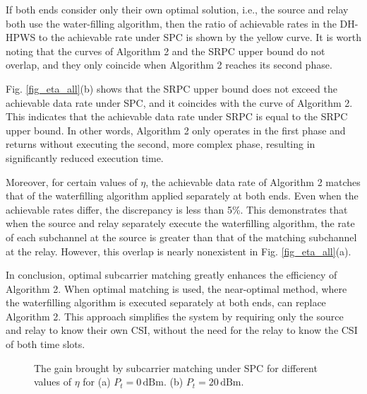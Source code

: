 \documentclass[lettersize,journal]{IEEEtran}
\begin{document}
	If both ends consider only their own optimal solution, i.e., the source and relay both use the water-filling algorithm, then the ratio of achievable rates in the DH-HPWS to the achievable rate under SPC is shown by the yellow curve. It is worth noting that the curves of Algorithm 2 and the SRPC upper bound do not overlap, and they only coincide when Algorithm 2 reaches its second phase.
	
	Fig.  \ref{fig_eta_all}(b) shows that the SRPC upper bound does not exceed the achievable data rate under SPC, and it coincides with the curve of Algorithm 2. This indicates that the achievable data rate under SRPC is equal to the SRPC upper bound. In other words, Algorithm 2 only operates in the first phase and returns without executing the second, more complex phase, resulting in significantly reduced execution time.
	
	Moreover, for certain values of \( \eta \), the achievable data rate of Algorithm 2 matches that of the waterfilling algorithm applied separately at both ends. Even when the achievable rates differ, the discrepancy is less than 5\%. This demonstrates that when the source and relay separately execute the waterfilling algorithm, the rate of each subchannel at the source is greater than that of the matching subchannel at the relay. However, this overlap is nearly nonexistent in Fig. \ref{fig_eta_all}(a).
	
	In conclusion, optimal subcarrier matching greatly enhances the efficiency of Algorithm 2. When optimal matching is used, the near-optimal method, where the waterfilling algorithm is executed separately at both ends, can replace Algorithm 2. This approach simplifies the system by requiring only the source and relay to know their own CSI, without the need for the relay to know the CSI of both time slots.
	
	\begin{figure}[!t]
		\centering
		\hfil
		\caption{The gain brought by subcarrier matching under SPC for different values of \( \eta \) for (a) \( P_t = 0 \, \text{dBm} \). (b) \( P_t = 20 \, \text{dBm} \).}
		\label{fig_beta_all}
	\end{figure}
	
\end{document}
